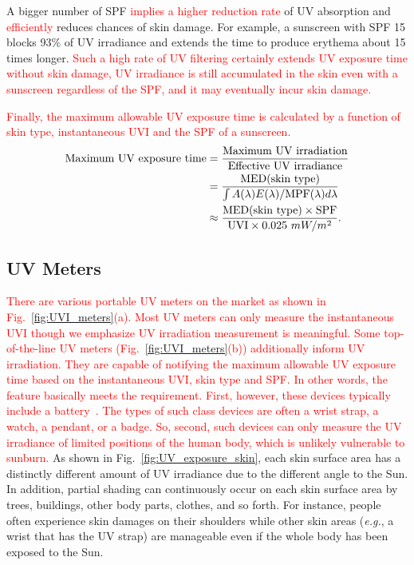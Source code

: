 \documentclass[journal]{IEEEtran}
\begin{document}
A bigger number of SPF \textcolor{red}{implies a higher reduction rate} of UV absorption and \textcolor{red}{efficiently} reduces chances of skin damage. For example, a sunscreen with SPF 15 blocks 93\% of UV irradiance and extends the time to produce erythema about 15 times longer. \textcolor{red}{Such a high rate of UV filtering certainly extends UV exposure time without skin damage, UV irradiance is still accumulated in the skin even with a sunscreen regardless of the SPF, and it may eventually incur skin damage.}

\textcolor{red}{Finally, the maximum allowable UV exposure time is calculated by a function of skin type, instantaneous UVI and the SPF of a sunscreen.} 
\begin{equation} \label{eq: max_exp_time}
\begin{split}
\text{\rm Maximum~UV~exposure~time}
&= \frac{\rm Maximum~UV~irradiation}{\rm Effective~UV~irradiance} \\
&= \frac{\text{MED}(\text{skin~type})}{\int A(\lambda)E(\lambda)  / \text{MPF}(\lambda) d \lambda} \\
&\approx \frac{\text{MED}(\text{skin~type})\times \text{SPF}}{\text{UVI} \times 0.025~mW/m^2}.
\end{split}
\end{equation}


\subsection{UV Meters}
\textcolor{red}{There are various portable UV meters on the market as shown in Fig.~\ref{fig:UVI_meters}(a). Most UV meters can only measure the instantaneous UVI though we emphasize UV irradiation measurement is meaningful. Some top-of-the-line UV meters (Fig.~\ref{fig:UVI_meters}(b)) additionally inform UV irradiation. They are capable of notifying the maximum allowable UV exposure time based on the instantaneous UVI, skin type and SPF. In other words, the feature basically meets the requirement.  First, however, these devices typically include a battery~\cite{Netatmo, Ultra}. The types of such class devices are often a wrist strap, a watch, a pendant, or a badge. So, second, such devices can only measure the UV irradiance of limited positions of the human body, which is unlikely vulnerable to sunburn.} 
%
As shown in Fig.~\ref{fig:UV_exposure_skin}, each skin surface area has a distinctly different amount of UV irradiance due to the different angle to the Sun. In addition, partial shading can continuously occur on each skin surface area by trees, buildings, other body parts, clothes, and so forth. For instance, people often experience skin damages on their shoulders while other skin areas (\textit{e.g.}, a wrist that has the UV strap) are manageable even if the whole body has been exposed to the Sun.
\end{document}
